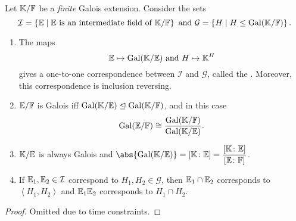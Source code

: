 \begin{theorem}
    Let $\mathbb{K}/\mathbb{F}$ be a \emph{finite} Galois extension. Consider the sets
    \[
        \mathcal{I} = \left\{ \mathbb{E} \mid \mathbb{E} \text{ is an intermediate field of $\mathbb{K}/\mathbb{F}$} \right\} \text{ and } \mathcal{G} = \left\{ H \mid H \leq \operatorname{Gal}(\mathbb{K}/\mathbb{F}) \right\}.
    \]
    \begin{enumerate}
        \item The maps 
        \[
            \mathbb{E} \mapsto \operatorname{Gal}(\mathbb{K}/\mathbb{E}) \text{ and } H \mapsto \mathbb{K}^H
        \]
        gives a one-to-one correspondence between $\mathcal{I}$ and $\mathcal{G}$, called the . Moreover, this correspondence is inclusion reversing.
        
        \item $\mathbb{E}/\mathbb{F}$ is Galois iff $\operatorname{Gal}(\mathbb{K}/\mathbb{E}) \trianglelefteq \operatorname{Gal}(\mathbb{K}/\mathbb{F})$, and in this case
        \[
            \operatorname{Gal}(\mathbb{E}/\mathbb{F}) \cong \frac{\operatorname{Gal}(\mathbb{K}/\mathbb{F})}{\operatorname{Gal}(\mathbb{K}/\mathbb{E})}.
        \]
        
        \item $\mathbb{K}/\mathbb{E}$ is always Galois and $\abs{\Gal(\K/\E)} = \left[ \K \colon \E \right] = \dfrac{\left[ \K \colon \E \right]}{\left[ \E \colon \F \right]}$.
        
        \item If $\mathbb{E}_1, \mathbb{E}_2 \in \mathcal{I}$ correspond to $H_1, H_2 \in \mathcal{G}$, then $\mathbb{E}_1 \cap \mathbb{E}_2$ corresponds to $ \left\langle H_1, H_2 \right\rangle$ and $\mathbb{E}_1\mathbb{E}_2$ corresponds to $H_1 \cap H_2$.
    \end{enumerate}
\end{theorem}
\begin{proof}
    Omitted due to time constraints.
\end{proof}